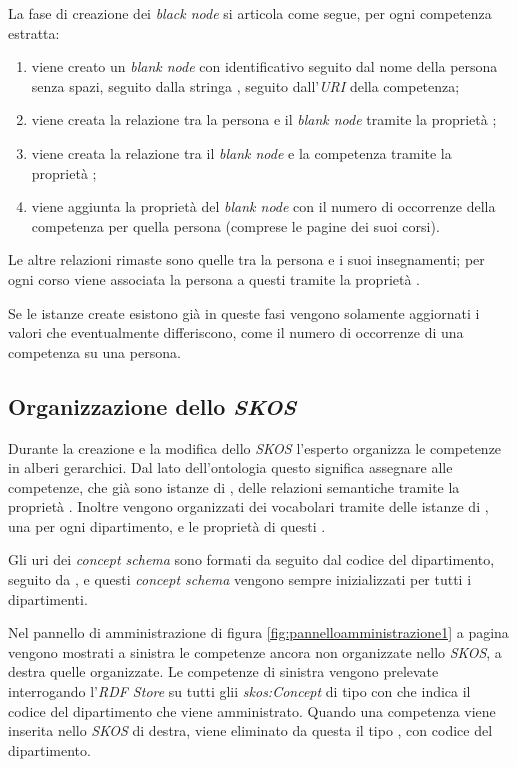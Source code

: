 \documentclass[tesi.tex]{subfiles}
\begin{document}
La fase di creazione dei \emph{black node} si articola come segue, per
ogni competenza estratta:
\begin{enumerate}
\item viene creato un \emph{blank node} con
  identificativo \xml{\_:} seguito dal nome della persona senza spazi,
  seguito dalla stringa , seguito dall'\emph{URI}
  della competenza;
\item viene creata la relazione tra la persona e il \emph{blank node}
  tramite la propriet\`a ;
\item viene creata la relazione tra il \emph{blank node} e la
  competenza tramite la propriet\`a ;
\item viene aggiunta la propriet\`a del \emph{blank node}
   con il numero di occorrenze della competenza
  per quella persona (comprese le pagine dei suoi corsi).
\end{enumerate}

Le altre relazioni rimaste sono quelle tra la persona e i suoi insegnamenti;
per ogni corso viene associata la persona a questi tramite la
propriet\`a .

Se le istanze create esistono gi\`a in queste fasi vengono solamente
aggiornati i valori che eventualmente differiscono, come il numero di
occorrenze di una competenza su una persona.

\subsection{Organizzazione dello \emph{SKOS}}
Durante la creazione e la modifica dello \emph{SKOS} l'esperto
organizza le competenze in alberi gerarchici. Dal
lato dell'ontologia questo significa assegnare alle competenze, che
gi\`a sono istanze di , delle relazioni semantiche
tramite la propriet\`a . Inoltre vengono
organizzati dei vocabolari tramite delle istanze di
, una per ogni dipartimento, e le propriet\`a
di questi .

Gli uri dei \emph{concept schema} sono formati da
 seguito dal codice del dipartimento,
seguito da , e questi \emph{concept schema}
vengono sempre inizializzati per tutti i dipartimenti.

Nel pannello di amministrazione di figura
\ref{fig:pannelloamministrazione1} a pagina
\pageref{fig:pannelloamministrazione1} vengono mostrati a sinistra le
competenze ancora non organizzate nello \emph{SKOS}, a destra quelle
organizzate. Le competenze di sinistra vengono prelevate interrogando
l'\emph{RDF Store} su tutti glii \emph{skos:Concept} di tipo
 con  che indica il codice del
dipartimento che viene amministrato.
Quando una competenza viene inserita nello \emph{SKOS} di destra,
viene eliminato da questa il tipo , con
 codice del dipartimento.
\end{document}

